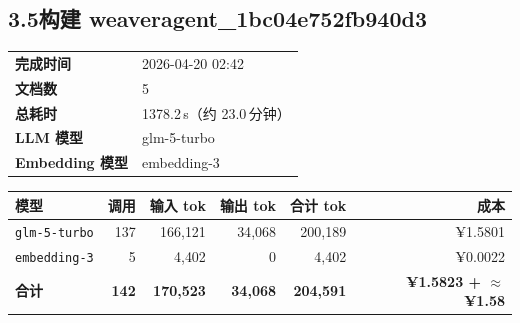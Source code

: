 \documentclass[11pt]{article}
\begin{document}
\subsection*{3.5\;构建 weaveragent\_1bc04e752fb940d3}
\noindent\begin{minipage}{\textwidth}
\begin{tabular}{@{}ll@{}}
\textbf{完成时间} & 2026-04-20 02:42 \\
\textbf{文档数} & 5 \\
\textbf{总耗时} & 1378.2\,s（约 23.0\,分钟） \\
\textbf{LLM 模型} & glm-5-turbo \\
\textbf{Embedding 模型} & embedding-3 \\
\end{tabular}
\end{minipage}
\par\vspace{0.25cm}
\noindent\begin{tabularx}{\textwidth}{@{}X r r r r r@{}}
\toprule
\rowcolor{headerbg!10}\textbf{模型} & \textbf{调用} & \textbf{输入 tok} & \textbf{输出 tok} & \textbf{合计 tok} & \textbf{成本} \\
\midrule
\rowcolor{rowalt}\texttt{\small glm-5-turbo} & 137 & 166{,}121 & 34{,}068 & 200{,}189 & ¥1.5801 \\
\texttt{\small embedding-3} & 5 & 4{,}402 & 0 & 4{,}402 & ¥0.0022 \\
\midrule
\rowcolor{headerbg!15}\textbf{合计} & \textbf{142} & \textbf{170{,}523} & \textbf{34{,}068} & \textbf{204{,}591} & \textbf{¥1.5823 + $\approx$ ¥1.58} \\
\bottomrule
\end{tabularx}
\vspace{0.5cm}
\end{document}
